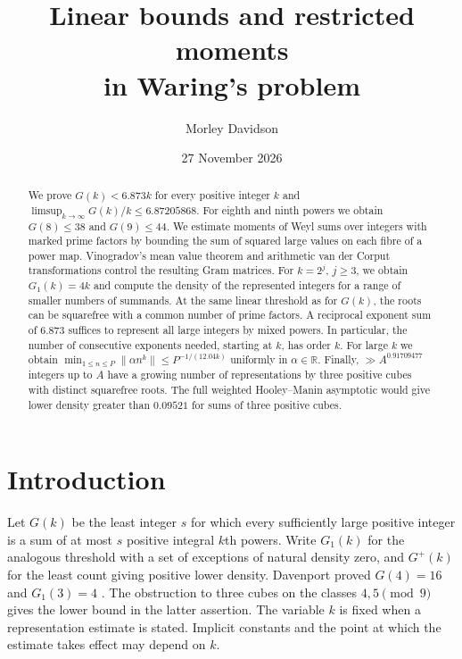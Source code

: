 \documentclass[11pt,letterpaper]{article}
\title{\textbf{Linear bounds and restricted moments\\ in Waring's problem}}
\author{Morley Davidson}
\date{27 November 2026}
\theoremstyle{definition}
\begin{document}
\maketitle
\begin{abstract}
We prove $G(k)<6.873k$ for every positive integer $k$ and
$\limsup_{k\to\infty}G(k)/k\le6.87205868$. For eighth and ninth powers
we obtain $G(8)\le38$ and $G(9)\le44$. We estimate moments of Weyl
sums over integers with marked prime factors by bounding the sum of
squared large values on each fibre of a power map. Vinogradov's mean
value theorem and arithmetic van der Corput transformations control the
resulting Gram matrices. For $k=2^j$, $j\ge3$, we obtain $G_1(k)=4k$
and compute the density of the represented integers for a range of
smaller numbers of summands. At the same linear threshold as for $G(k)$,
the roots can be squarefree with a common number of prime factors.
A reciprocal exponent sum of $6.873$ suffices to represent all large
integers by mixed powers. In particular, the number of consecutive
exponents needed, starting at $k$, has order $k$. For large $k$ we obtain
$\min_{1\le n\le P}\|\alpha n^k\|\le P^{-1/(12.04k)}$ uniformly in
$\alpha\in\mathbb R$. Finally, $\gg A^{0.91709477}$ integers up to $A$
have a growing number of representations by three positive cubes with
distinct squarefree roots. The full weighted Hooley--Manin asymptotic
would give lower density greater than $0.09521$ for sums of three
positive cubes.
\end{abstract}
{\small\setcounter{tocdepth}{1}\tableofcontents}
\section{Introduction}
Let $G(k)$ be the least integer $s$ for which every sufficiently large
positive integer is a sum of at most $s$ positive integral $k$th powers.
Write $G_1(k)$ for the analogous threshold with a set of exceptions of
natural density zero, and $G^+(k)$ for the least count giving positive lower density. Davenport proved $G(4)=16$ and $G_1(3)=4$ \cite{DavenportFour,DavenportThree}. The obstruction to three cubes on the classes $4,5\pmod9$ gives the lower bound in the latter assertion. The variable $k$ is fixed when a representation
estimate is stated. Implicit constants and the point at which the estimate
takes effect may depend on $k$.
\end{document}
